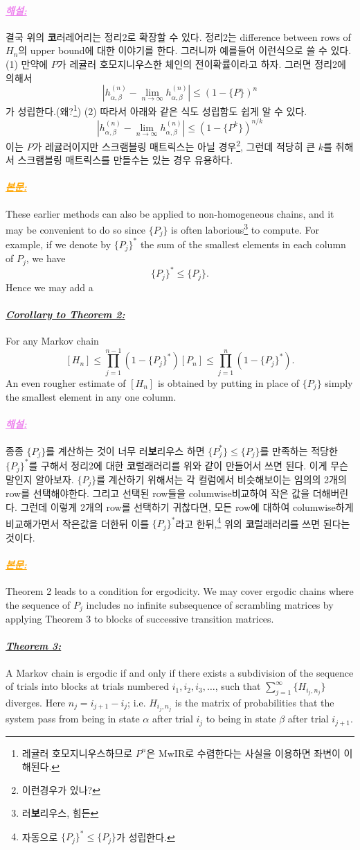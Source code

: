 \documentclass[12pt,oneside,english,a4paper]{article}
\newcommand{\para}[1]{\paragraph{\LARGE\it\underline{\textbf{#1:}}}\LARGE}
\newcommand{\paraviolet}[1]{\paragraph{\LARGE\textcolor{violet}{\it\underline{\textbf{#1:}}}}\LARGE}
\newcommand{\paraorange}[1]{\paragraph{\LARGE\textcolor{orange}{\it\underline{\textbf{#1:}}}}\LARGE}
\begin{document}
\paraviolet{해설} 결국 위의 {\bf 코}러레어리는 정리2로 확장할 수 있다. 정리2는 difference between rows of $H_n$의 upper bound에 대한 이야기를 한다. 그러니까 예를들어 이런식으로 쓸 수 있다. (1) 만약에 $P$가 레귤러 호모지니우스한 체인의 전이확률이라고 하자. 그러면 정리2에 의해서
\[
\left|h_{\alpha,\beta}^{(n)}-\lim_{n\to\infty} h_{\alpha,\beta}^{(n)}\right| \leq (1-\{P\})^n
\]
가 성립한다.(왜?\footnote{레귤러 호모지니우스하므로 $P^n$은 MwIR로 수렴한다는 사실을 이용하면 좌변이 이해된다.}) (2) 따라서 아래와 같은 식도 성립함도 쉽게 알 수 있다. 
\[
\left|h_{\alpha,\beta}^{(n)}-\lim_{n\to\infty} h_{\alpha,\beta}^{(n)}\right| \leq (1-\{P^k\})^{n/k}
\]
이는 $P$가 레귤러이지만 스크램블링 매트릭스는 아닐 경우\footnote{이런경우가 있나?}, 그런데 적당히 큰 $k$를 취해서 스크램블링 매트릭스를 만들수는 있는 경우 유용하다. 

\paraorange{본문} These earlier methods can also be applied to non-homogeneous chains, and it may be convenient to do so since $\{P_j\}$ is often laborious\footnote{러{\bf 보}리우스, 힘든} to compute. For example, if we denote by $\{P_j\}^\ast$ the sum of the smallest elements in each column of $P_j$, we have
\[
\{P_j\}^\ast \leq \{P_j\}.
\]
Hence we may add a 
\para{Corollary to Theorem 2} For any Markov chain 
\[
[H_n]\leq \prod_{j=1}^{n-1}(1-\{P_j\}^\ast)[P_n]\leq \prod_{j=1}^{n}(1-\{P_j\}^\ast).
\]
An even rougher estimate of $[H_n]$ is obtained by putting in place of $\{P_j\}$ simply the smallest element in any one column. 

\paraviolet{해설} 종종 $\{P_j\}$를 계산하는 것이 너무 러{\bf 보}리우스 하면 $\{P_j^\ast\}\leq \{P_j\}$를 만족하는 적당한 $\{P_j\}^\ast$를 구해서 정리2에 대한 {\bf 코}럴래러리를 위와 같이 만들어서 쓰면 된다. 이게 무슨말인지 알아보자. $\{P_j\}$를 계산하기 위해서는 각 컬럼에서 비슷해보이는 임의의 2개의 row를 선택해야한다. 그리고 선택된 row들을 columwise비교하여 작은 값을 더해버린다. 그런데 이렇게 2개의 row를 선택하기 귀찮다면, 모든 row에 대하여 columwise하게 비교해가면서 작은값을 더한뒤 이를 $\{P_j\}^\ast$라고 한뒤,\footnote{자동으로 $\{P_j\}^\ast \leq \{P_j\}$가 성립한다.} 위의 {\bf 코}럴래러리를 쓰면 된다는 것이다. 

\paraorange{본문} Theorem 2 leads to a condition for ergodicity. We may cover ergodic chains where the sequence of $P_j$ includes no infinite subsequence of scrambling matrices by applying Theorem 3 to blocks of successive transition matrices. 

\para{Theorem 3} A Markov chain is ergodic if and only if there exists a subdivision of the sequence of trials into blocks at trials numbered $i_1,i_2,i_3,\dots$, such that $\sum_{j=1}^{\infty}\{H_{i_j,n_j}\}$ diverges.
Here $n_j=i_{j+1}-i_j$; i.e. $H_{i_j,n_j}$ is the matrix of probabilities that the system pass from being in state $\alpha$ after trial $i_j$ to being in state $\beta$ after trial $i_{j+1}$.
\end{document}

